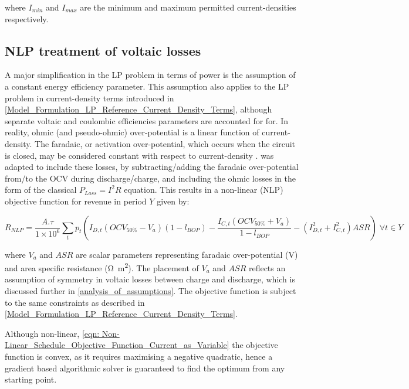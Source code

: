 \documentclass[preprint,3p,review,authoryear,10pt]{elsarticle}
\begin{document}
where $I_{min}$ and $I_{max}$ are the minimum and maximum permitted current-densities respectively.

\subsection{NLP treatment of voltaic losses}
\label{Model_Formulation_NLP_treatment_voltaic_losses}

A major simplification in the LP problem in terms of power is the assumption of a constant energy efficiency parameter. This assumption also applies to the LP problem in current-density terms introduced in \cref{Model_Formulation_LP_Reference_Current_Density_Terms}, although separate voltaic and coulombic efficiencies parameters are accounted for for. In reality, ohmic (and pseudo-ohmic) over-potential is a linear function of current-density. The faradaic, or activation over-potential, which occurs when the circuit is closed, may be considered constant with respect to current-density \cite{Aaron2011}.  was adapted to include these losses, by subtracting/adding the faradaic over-potential from/to the OCV during discharge/charge, and including the ohmic losses in the form of the classical $P_{Loss} = I^2R$ equation. This results in a non-linear (NLP) objective function for revenue in period $Y$ given by:

\begin{equation}
\label{eqn: Non-Linear_Schedule_Objective_Function_Current_as_Variable}
R_{NLP} = \frac{A.\tau}{1\times 10^{6}}\sum_{t}p_{t}(I_{D, t}(OCV_{50\%} - V_a)(1-l_{BOP}) - \frac{I_{C, t}(OCV_{50\%} + V_a)}{1-l_{BOP}} - (I_{D,t}^{2} + I_{C,t}^{2})ASR) \; \forall t \in Y
\end{equation}


where $V_a$ and $ASR$ are scalar parameters representing faradaic over-potential (\si{\volt}) and area specific resistance (\si{\ohm\square\meter}). The placement of $V_a$ and $ASR$ reflects an assumption of symmetry in voltaic losses between charge and discharge, which is discussed further in \cref{analysis_of_assumptions}. The objective function is subject to the same constraints as described in \cref{Model_Formulation_LP_Reference_Current_Density_Terms}.

Although non-linear, \cref{eqn: Non-Linear_Schedule_Objective_Function_Current_as_Variable} the objective function is convex, as it requires maximising a negative quadratic, hence a gradient based algorithmic solver is guaranteed to find the optimum from any starting point. 
\end{document}
